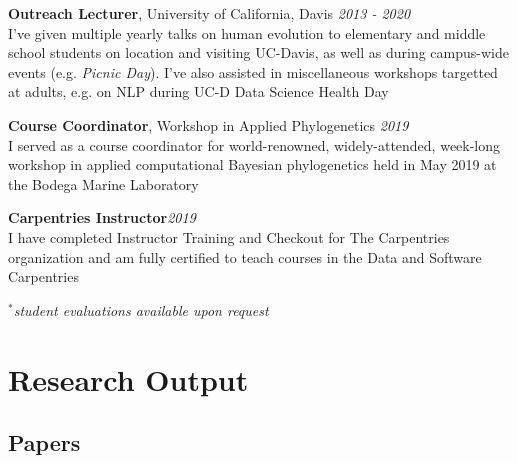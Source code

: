 \documentclass[12pt]{article}
\begin{document}
\textbf{Outreach Lecturer}, University of California, Davis \hfill \emph{2013  - 2020}\\
I've given multiple yearly talks on human evolution to elementary and middle school students on location and visiting UC-Davis, as well as during campus-wide events (e.g. \emph{Picnic Day}). I've also assisted in miscellaneous workshops targetted at adults, e.g. on NLP during UC-D Data Science Health Day

\textbf{Course Coordinator}, Workshop in Applied Phylogenetics \hfill \emph{2019}\\
I served as a course coordinator for world-renowned, widely-attended, week-long workshop in applied computational Bayesian phylogenetics held in May 2019 at the Bodega Marine Laboratory

\textbf{Carpentries Instructor}\hfill \emph{2019}\\
I have completed Instructor Training and Checkout for The Carpentries organization and am fully certified to teach courses in the Data and Software Carpentries

$^{*}$\emph{student evaluations available upon request}

\section{Research Output}

\subsection{Papers}
\end{document}

